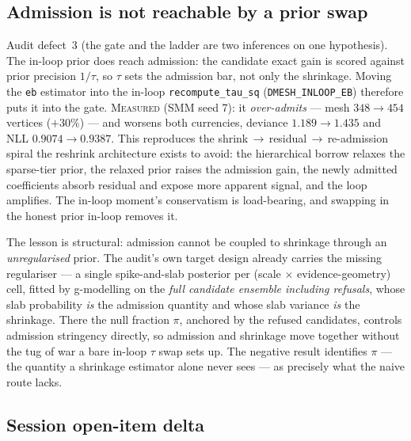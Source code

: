 \subsection{Admission is not reachable by a prior swap}\label{sec:aug12-admission}

Audit defect~3 (the gate and the ladder are two inferences on one hypothesis).
The in-loop prior does reach admission: the candidate exact gain is scored
against prior precision $1/\tau$, so $\tau$ sets the admission bar, not only the
shrinkage. Moving the \texttt{eb} estimator into the in-loop
\texttt{recompute\_tau\_sq} (\texttt{DMESH\_INLOOP\_EB}) therefore puts it into
the gate. \textsc{Measured} (SMM seed 7): it \emph{over-admits} --- mesh
$348\to454$ vertices ($+30\%$) --- and worsens both currencies, deviance
$1.189\to1.435$ and NLL $0.9074\to0.9387$. This reproduces the
shrink\,$\to$\,residual\,$\to$\,re-admission spiral the reshrink architecture
exists to avoid: the hierarchical borrow relaxes the sparse-tier prior, the
relaxed prior raises the admission gain, the newly admitted coefficients absorb
residual and expose more apparent signal, and the loop amplifies. The in-loop
moment's conservatism is load-bearing, and swapping in the honest prior
in-loop removes it.

The lesson is structural: admission cannot be coupled to shrinkage through an
\emph{unregularised} prior. The audit's own target design already carries the
missing regulariser --- a single spike-and-slab posterior per
(scale $\times$ evidence-geometry) cell, fitted by g-modelling on the
\emph{full candidate ensemble including refusals}, whose slab probability
\emph{is} the admission quantity and whose slab variance \emph{is} the
shrinkage. There the null fraction $\pi$, anchored by the refused candidates,
controls admission stringency directly, so admission and shrinkage move
together without the tug of war a bare in-loop $\tau$ swap sets up. The
negative result identifies $\pi$ --- the quantity a shrinkage estimator alone
never sees --- as precisely what the naive route lacks.

\subsection{Session open-item delta}\label{sec:aug12-open}

